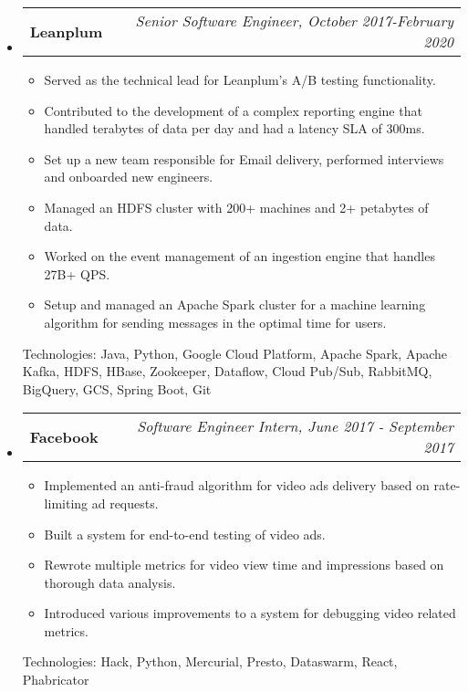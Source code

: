 \documentclass[letterpaper,10pt]{article}
\makeatletter
\newcommand{\ressubheading}[4]{
\begin{tabular*}{7.0in}{l@{\extracolsep{\fill}}r}
		\textbf{#1} & \textit{#4} \\
\end{tabular*}\vspace{-6pt}}
\makeatother
\begin{document}
\begin{itemize}
\item
	\ressubheading{Leanplum}{Sofia,  Bulgaria}{Senior Software Engineer}{Senior Software Engineer, October 2017-February 2020}
	\begin{itemize}
	\item Served as the technical lead for Leanplum's A/B testing functionality.
	\item Contributed to the development of a complex reporting engine that handled terabytes of data per day and had a latency SLA of 300ms.
	\item Set up a new team responsible for Email delivery,  performed interviews and onboarded new engineers.
	\item Managed an HDFS cluster with 200+ machines and 2+ petabytes of data.
	\item Worked on the event management of an ingestion engine that handles 27B+ QPS.
	\item Setup and managed an Apache Spark cluster for a machine learning algorithm for sending messages in the optimal time for users.
	\end{itemize}
	Technologies: Java, Python, Google Cloud Platform, Apache Spark, Apache Kafka, HDFS, HBase, Zookeeper, Dataflow, Cloud Pub/Sub, RabbitMQ, BigQuery, GCS, Spring Boot, Git

\item
	\ressubheading{Facebook}{London,  UK}{Software Engineer Intern}{Software Engineer Intern, June 2017 - September 2017}
	\begin{itemize}
     \item Implemented an anti-fraud algorithm for video ads delivery based on rate-limiting ad requests.
     \item Built a system for end-to-end testing of video ads.
     \item Rewrote multiple metrics for video view time and impressions based on thorough data analysis.
     \item Introduced various improvements to a system for debugging video related metrics.

	\end{itemize}
Technologies: Hack, Python, Mercurial, Presto, Dataswarm, React, Phabricator
\end{itemize}
\end{document}

